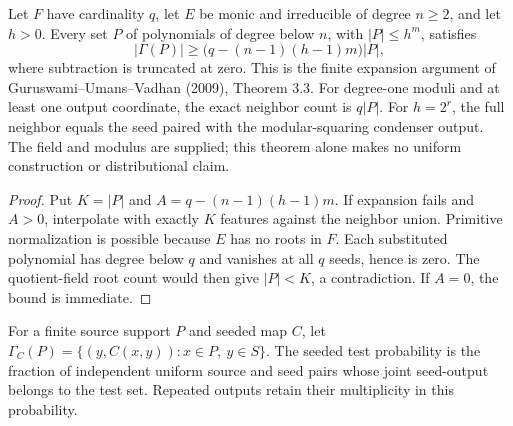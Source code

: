 \begin{theorem}
  \label{thm:lowerbounds-algebraic-condenser-expansion}
  \leanok
  Let $F$ have cardinality $q$, let $E$ be monic and irreducible of
  degree $n\ge2$, and let $h>0$. Every set $P$ of polynomials of
  degree below $n$, with $|P|\le h^m$, satisfies
  \[
    |\Gamma(P)|\ge\bigl(q-(n-1)(h-1)m\bigr)|P|,
  \]
  where subtraction is truncated at zero. This is the finite
  expansion argument of Guruswami--Umans--Vadhan (2009), Theorem 3.3.
  For degree-one moduli and at least one output coordinate, the exact
  neighbor count is $q|P|$. For $h=2^r$, the full neighbor equals the
  seed paired with the modular-squaring condenser output.
  The field and modulus are supplied; this theorem alone makes no
  uniform construction or distributional claim.
\end{theorem}
\begin{proof}
  \leanok
  Put $K=|P|$ and $A=q-(n-1)(h-1)m$. If expansion fails and $A>0$,
  interpolate with exactly $K$ features against the neighbor union.
  Primitive normalization is possible because $E$ has no roots in $F$.
  Each substituted polynomial has degree below $q$ and vanishes at all
  $q$ seeds, hence is zero. The quotient-field root count would then
  give $|P|<K$, a contradiction. If $A=0$, the bound is immediate.
\end{proof}

\begin{definition}
  \label{def:lowerbounds-algebraic-flat-lossless}
  \leanok
  For a finite source support $P$ and seeded map $C$, let
  $\Gamma_C(P)=\{(y,C(x,y)):x\in P,\ y\in S\}$. The seeded test
  probability is the fraction of independent uniform source and seed
  pairs whose joint seed-output belongs to the test set. Repeated
  outputs retain their multiplicity in this probability.
\end{definition}

